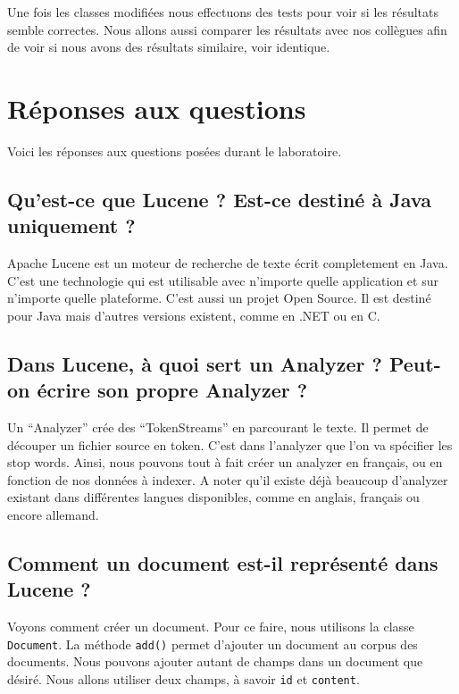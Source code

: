 \documentclass[a4paper, 11pt]{article}
\begin{document}
{Une fois les classes modifiées nous effectuons des tests pour voir si les résultats semble correctes. Nous allons aussi comparer les résultats avec nos collègues afin de voir si nous avons des résultats similaire, voir identique.

\section{Réponses aux questions} 

Voici les réponses aux questions posées durant le laboratoire.

\subsection{Qu’est-ce que Lucene ? Est-ce destiné à Java uniquement ?}

Apache Lucene est un moteur de recherche de texte écrit completement en Java. C'est une technologie qui est utilisable avec n'importe quelle application et sur n'importe quelle plateforme.
C'est aussi un projet Open Source. Il est destiné pour Java mais d'autres versions existent, comme en .NET ou en C.

\subsection{Dans Lucene, à quoi sert un Analyzer ? Peut-on écrire son propre Analyzer ?}
Un “Analyzer” crée des “TokenStreams” en parcourant le texte. Il permet de découper un fichier source en token. C'est dans l'analyzer que l'on va spécifier les stop words. Ainsi, nous pouvons tout à fait créer un analyzer en français, ou en fonction de nos données à indexer. A noter qu'il existe déjà beaucoup d'analyzer existant dans différentes langues disponibles, comme en anglais, français ou encore allemand. 
   
\subsection{Comment un document est-il représenté dans Lucene ?}
Voyons comment créer un document. Pour ce faire, nous utilisons la classe \texttt{Document}. La méthode \texttt{add()} permet d'ajouter un document au corpus des documents. Nous pouvons ajouter autant de champs dans un document que désiré. Nous allons utiliser deux champs, à savoir \texttt{id} et \texttt{content}. 

}
\end{document}
